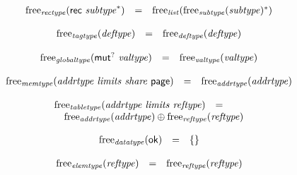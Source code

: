 $$
\begin{array}[t]{@{}lcl@{}l@{}}
{\mathrm{free}}_{\mathit{rectype}}(\mathsf{rec}~{{\mathit{subtype}}^\ast}) & = & {\mathrm{free}}_{\mathit{list}}({{\mathrm{free}}_{\mathit{subtype}}({\mathit{subtype}})^\ast}) \\
\end{array}
$$

$$
\begin{array}[t]{@{}lcl@{}l@{}}
{\mathrm{free}}_{\mathit{tagtype}}({\mathit{deftype}}) & = & {\mathrm{free}}_{\mathit{deftype}}({\mathit{deftype}}) \\
\end{array}
$$

$$
\begin{array}[t]{@{}lcl@{}l@{}}
{\mathrm{free}}_{\mathit{globaltype}}({\mathsf{mut}^?}~{\mathit{valtype}}) & = & {\mathrm{free}}_{\mathit{valtype}}({\mathit{valtype}}) \\
\end{array}
$$

$$
\begin{array}[t]{@{}lcl@{}l@{}}
{\mathrm{free}}_{\mathit{memtype}}({\mathit{addrtype}}~{\mathit{limits}}~{\mathit{share}}~\mathsf{page}) & = & {\mathrm{free}}_{\mathit{addrtype}}({\mathit{addrtype}}) \\
\end{array}
$$

$$
\begin{array}[t]{@{}lcl@{}l@{}}
{\mathrm{free}}_{\mathit{tabletype}}({\mathit{addrtype}}~{\mathit{limits}}~{\mathit{reftype}}) & = & & \\
 \multicolumn{4}{@{}l@{}}{\quad
\begin{array}[t]{@{}l@{}}
{\mathrm{free}}_{\mathit{addrtype}}({\mathit{addrtype}}) \oplus {\mathrm{free}}_{\mathit{reftype}}({\mathit{reftype}}) \\
\end{array}
} \\
\end{array}
$$

$$
\begin{array}[t]{@{}lcl@{}l@{}}
{\mathrm{free}}_{\mathit{datatype}}(\mathsf{ok}) & = & \{  \} \\
\end{array}
$$

$$
\begin{array}[t]{@{}lcl@{}l@{}}
{\mathrm{free}}_{\mathit{elemtype}}({\mathit{reftype}}) & = & {\mathrm{free}}_{\mathit{reftype}}({\mathit{reftype}}) \\
\end{array}
$$

